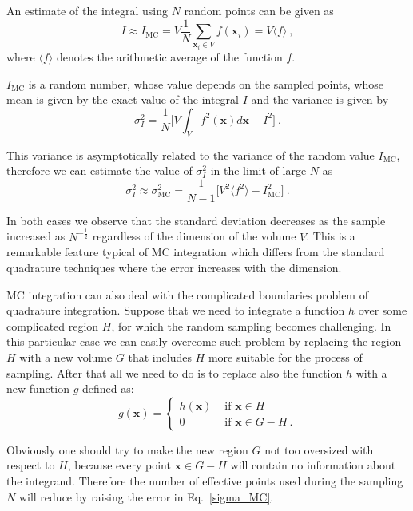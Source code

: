 \documentclass[../main/main.tex]{subfiles}
\begin{document}
An estimate of the integral using $N$ random points can be given as
\begin{equation}
	I \approx I_{\text{MC}} = V \frac{1}{N} \sum_{\textbf{x}_i \in V} f(\textbf{x}_i) = V \langle f \rangle \ ,
\end{equation}
where $\langle f \rangle$ denotes the arithmetic average of the function $f$.

$I_{\text{MC}}$ is a random number, whose value depends on the sampled points, whose mean 
is given by the exact value of the integral $I$ and the variance is given by
\begin{equation}
	\label{variance}
	\sigma^2_I = \frac{1}{N} \big[ V \int_{V}   f^2(\textbf{x}) d \textbf{x}  - I^2 \big] \ .
\end{equation}

This variance is asymptotically related to the variance of the random value $I_{\text{MC}}$, therefore
we can estimate the value of $\sigma^2_I$ in the limit of large $N$ as
\begin{equation}
	\label{sigma_MC}
	\sigma^2_I \approx \sigma^2_\text{MC}  = \frac{1}{N-1} \Big[ 
	V^2 \langle  f^2 \rangle 
	- I^2_{\text{MC}}\Big] \ .
\end{equation}

In both cases we observe that the standard deviation decreases as the sample increased 
as $N^{-\frac{1}{2}}$ regardless of the dimension of the volume $V$. This is a remarkable feature 
typical of MC integration which differs from the standard quadrature techniques where the error 
increases with the dimension.

MC integration can also deal with the complicated boundaries problem of quadrature integration.
Suppose that we need to integrate a function $h$ over some complicated region $H$, for which the 
random sampling becomes challenging. 
In this particular case we can easily overcome such problem by replacing the region $H$ with a new volume 
$G$ that includes $H$ more suitable for the process of sampling. After that all we need to do is to replace also 
the function $h$ with a new function $g$ defined as:
\begin{equation}
	g(\textbf{x}) = \begin{cases}
		h(\textbf{x}) &\text{ if $\textbf{x} \in H$} \\
		0 &\text{ if $\textbf{x} \in G - H$} \ .
	\end{cases}
\end{equation}

Obviously one should try to make the new region $G$ not too oversized with respect to $H$, because every 
point $\textbf{x} \in G - H$ will contain no information about the integrand. Therefore the number of 
effective points used during the sampling $N$ will reduce by raising the error in Eq.~\eqref{sigma_MC}.
\end{document}
